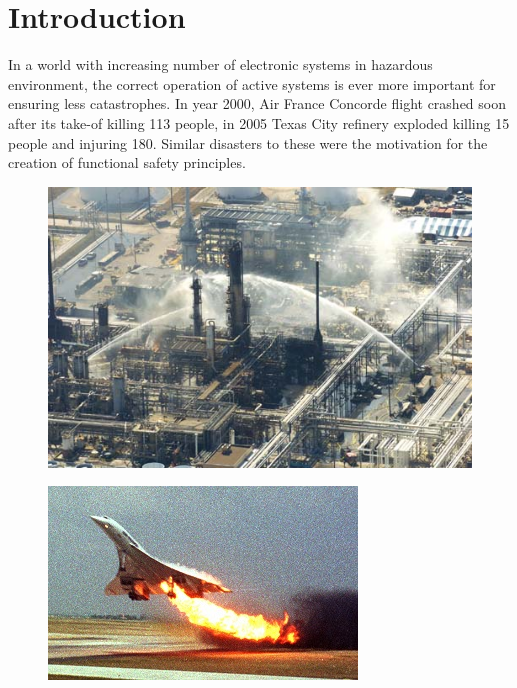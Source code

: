 \chapter*{Introduction} 

In a world with increasing number of electronic systems in hazardous environment, the correct operation of active systems is ever more important for ensuring less catastrophes. In year 2000, Air France Concorde flight crashed soon after its take-of killing 113 people, in 2005 Texas City refinery exploded killing 15 people and injuring 180. Similar disasters to these were the motivation for the  creation of functional safety principles. 
\begin{figure}[H]
    \centering
    \begin{minipage}{.5\textwidth}
          \centering
          \includegraphics[width=.7\linewidth]{images/texas_refinery.jpg}
          \label{fig:texas_refinery}
    \end{minipage}%
    \begin{minipage}{.5\textwidth}
          \centering
          \includegraphics[width=.74\linewidth]{images/concorde_disaster.jpg}
          \label{fig:concorde_disaster}
    \end{minipage}
\end{figure}


